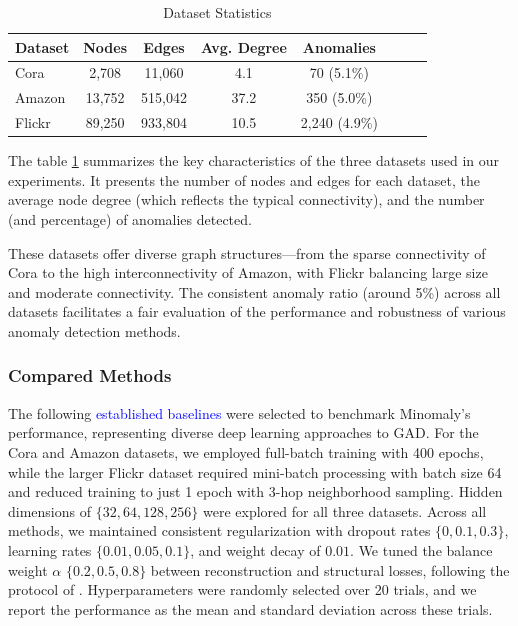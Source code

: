 \documentclass[preprint,12pt]{elsarticle}
\newcommand{\new}[1]{\textcolor{blue}{#1}}
\theoremstyle{plain}
\theoremstyle{definition}
\theoremstyle{remark}
\begin{document}
\begin{table}[htbp]
\centering
\caption{Dataset Statistics}
\label{tab:datasets}
\scriptsize
\begin{tabular}{lccccccc}
\toprule
Dataset       & Nodes  & Edges   & Avg. Degree & Anomalies \\
\midrule
Cora     & 2,708  & 11,060  & 4.1         & 70 (5.1\%)    \\
Amazon   & 13,752 & 515,042 & 37.2        & 350 (5.0\%)    \\
Flickr   & 89,250 & 933,804 & 10.5        & 2,240 (4.9\%)    \\
\bottomrule
\end{tabular}
\end{table}

The table \ref{tab:datasets} summarizes the key characteristics of the three datasets used in our experiments. It presents the number of nodes and edges for each dataset, the average node degree (which reflects the typical connectivity), and the number (and percentage) of anomalies detected.

These datasets offer diverse graph structures—from the sparse connectivity of Cora to the high interconnectivity of Amazon, with Flickr balancing large size and moderate connectivity. The consistent anomaly ratio (around 5\%) across all datasets facilitates a fair evaluation of the performance and robustness of various anomaly detection methods.

\subsubsection{Compared Methods}
The following \new{established baselines} were selected to benchmark Minomaly's performance, representing diverse deep learning approaches to GAD. For the Cora and Amazon datasets, we employed full-batch training with 400 epochs, while the larger Flickr dataset required mini-batch processing with batch size 64 and reduced training to just 1 epoch with 3-hop neighborhood sampling. Hidden dimensions of $\{32, 64, 128, 256\}$ were explored for all three datasets. Across all methods, we maintained consistent regularization with dropout rates $\{0, 0.1, 0.3\}$, learning rates $\{0.01, 0.05, 0.1\}$, and weight decay of $0.01$. We tuned the balance weight $\alpha$ $\{0.2, 0.5, 0.8\}$ between reconstruction and structural losses, following the protocol of \cite{NEURIPS2022-acc1ec4a}. Hyperparameters were randomly selected over 20 trials, and we report the performance as the mean and standard deviation across these trials.
\end{document}
